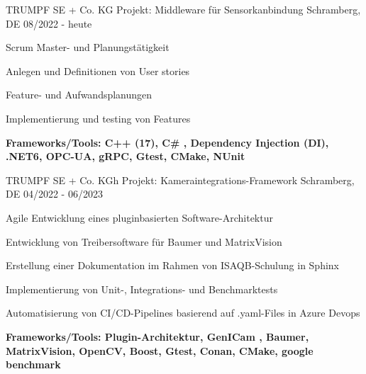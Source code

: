 \cventry
{TRUMPF SE + Co. KG} %
{Projekt:  Middleware für Sensorkanbindung} %
{Schramberg, DE} %
{08/2022 - heute} %
\begin{cvitems}
	\item{Scrum Master- und Planungstätigkeit}
	\item{Anlegen und Definitionen von User stories}
	\item{Feature- und Aufwandsplanungen}
	\item{Implementierung und testing von Features}
	\item{\textbf{Frameworks/Tools:  C++ (17), C\# , Dependency Injection (DI), .NET6,  OPC-UA, gRPC,  Gtest, CMake, NUnit} }
\end{cvitems}

\cventry
{TRUMPF SE + Co. KGh} %
{Projekt:  Kameraintegrations-Framework} %
{Schramberg, DE} %
{04/2022 - 06/2023} %
\begin{cvitems}
	\item{Agile Entwicklung eines pluginbasierten Software-Architektur}
	\item{Entwicklung von Treibersoftware für Baumer und MatrixVision}
	\item{Erstellung einer Dokumentation im Rahmen von ISAQB-Schulung in Sphinx}
	\item{Implementierung von Unit-, Integrations- und Benchmarktests}
	\item{Automatisierung von CI/CD-Pipelines basierend auf .yaml-Files in Azure Devops}
	\item{\textbf{Frameworks/Tools: Plugin-Architektur, GenICam , Baumer, MatrixVision, OpenCV, Boost, Gtest, Conan, CMake, google benchmark}}
\end{cvitems}
